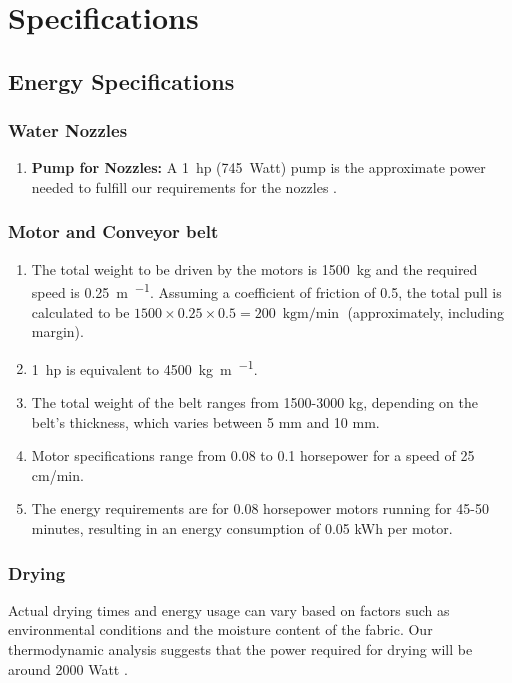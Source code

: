 \documentclass[12pt]{article} %
\begin{document}
\clearpage

\section{Specifications}
\subsection{Energy Specifications}

   \subsubsection{Water Nozzles} 
   \begin{enumerate}
   \item \textbf{Pump for Nozzles:} A \SI{1}{hp} (\SI{745}{Watt}) pump is the approximate power needed to fulfill our requirements for the nozzles \cite{pearlwater_2024_kirloskar_pump}.
   \end{enumerate}

\subsubsection{Motor and Conveyor belt} 
   \begin{enumerate}
   \item The total weight to be driven by the motors is \SI{1500}{kg} and the required speed is \SI{0.25}{\m\per\min}. Assuming a coefficient of friction of 0.5, the total pull is calculated to be $1500 \times 0.25 \times 0.5 = \SI{200}{\kg\m\per\min}$ (approximately, including margin).
   \item \SI{1}{hp} is equivalent to \SI{4500}{\kg\m\per\min}.
   \item The total weight of the belt ranges from 1500-3000 kg, depending on the belt's thickness, which varies between 5 mm and 10 mm.
   \item Motor specifications range from 0.08 to 0.1 horsepower for a speed of 25 cm/min.
   \item The energy requirements are for 0.08 horsepower motors running for 45-50 minutes, resulting in an energy consumption of 0.05 kWh per motor.
   \end{enumerate}

\subsubsection{Drying} 
Actual drying times and energy usage can vary based on factors such as environmental conditions and the moisture content of the fabric. Our thermodynamic analysis suggests that the power required for drying will be around 2000 Watt \cite{ambarita_2016_clothes_drying_cabinet}.
\end{document}
